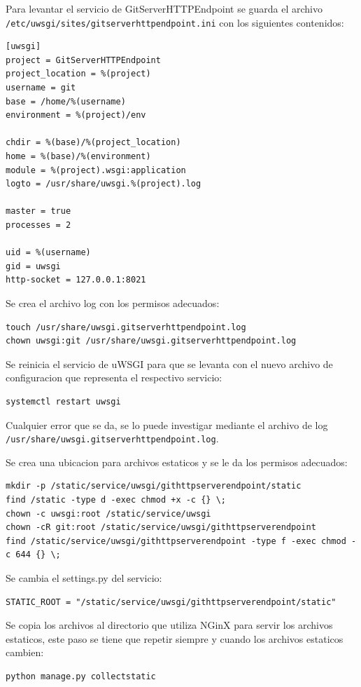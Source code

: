 Para levantar el servicio de GitServerHTTPEndpoint se guarda el archivo \\ \texttt{/etc/uwsgi/sites/gitserverhttpendpoint.ini} con los siguientes contenidos:
\begin{lstlisting}
[uwsgi]
project = GitServerHTTPEndpoint
project_location = %(project)
username = git
base = /home/%(username)
environment = %(project)/env

chdir = %(base)/%(project_location)
home = %(base)/%(environment)
module = %(project).wsgi:application
logto = /usr/share/uwsgi.%(project).log

master = true
processes = 2

uid = %(username)
gid = uwsgi
http-socket = 127.0.0.1:8021
\end{lstlisting}

Se crea el archivo log con los permisos adecuados:
\begin{lstlisting}
touch /usr/share/uwsgi.gitserverhttpendpoint.log
chown uwsgi:git /usr/share/uwsgi.gitserverhttpendpoint.log
\end{lstlisting}

Se reinicia el servicio de uWSGI para que se levanta con el nuevo archivo de configuracion que representa el respectivo servicio:
\begin{lstlisting}
systemctl restart uwsgi
\end{lstlisting}
Cualquier error que se da, se lo puede investigar mediante el archivo de log \\ \texttt{/usr/share/uwsgi.gitserverhttpendpoint.log}.

Se crea una ubicacion para archivos estaticos y se le da los permisos adecuados:
\begin{lstlisting}[breaklines=true]
mkdir -p /static/service/uwsgi/githttpserverendpoint/static
find /static -type d -exec chmod +x -c {} \;
chown -c uwsgi:root /static/service/uwsgi
chown -cR git:root /static/service/uwsgi/githttpserverendpoint
find /static/service/uwsgi/githttpserverendpoint -type f -exec chmod -c 644 {} \;
\end{lstlisting}

Se cambia el settings.py del servicio:
\lstset{language=Python}
\begin{lstlisting}
STATIC_ROOT = "/static/service/uwsgi/githttpserverendpoint/static"
\end{lstlisting}
\lstset{language=Bash}

Se copia los archivos al directorio que utiliza NGinX para servir los archivos estaticos, este paso se tiene que repetir siempre y cuando los archivos estaticos cambien:
\begin{lstlisting}
python manage.py collectstatic
\end{lstlisting}

